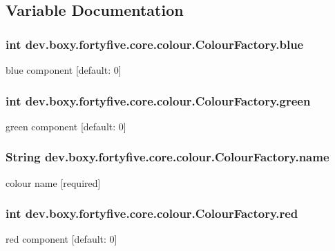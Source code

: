 \subsection{Variable Documentation}
\hypertarget{group__colours_gaa387e90b3938158d073d2aeae5105111}{
\subsubsection[{blue}]{\setlength{\rightskip}{0pt plus 5cm}int {\bf dev.boxy.fortyfive.core.colour.ColourFactory.blue}}}
\label{da/d58/group__colours_gaa387e90b3938158d073d2aeae5105111}
blue component \mbox{[}default: 0\mbox{]} \hypertarget{group__colours_gab377d979269fd05f929493dc79ee074a}{
\subsubsection[{green}]{\setlength{\rightskip}{0pt plus 5cm}int {\bf dev.boxy.fortyfive.core.colour.ColourFactory.green}}}
\label{da/d58/group__colours_gab377d979269fd05f929493dc79ee074a}
green component \mbox{[}default: 0\mbox{]} \hypertarget{group__colours_ga4d56f9874f82e7285e41c8a295069047}{
\subsubsection[{name}]{\setlength{\rightskip}{0pt plus 5cm}String {\bf dev.boxy.fortyfive.core.colour.ColourFactory.name}}}
\label{da/d58/group__colours_ga4d56f9874f82e7285e41c8a295069047}
colour name \mbox{[}required\mbox{]} \hypertarget{group__colours_gab62f99627952fcf9923c257b8a6da024}{
\subsubsection[{red}]{\setlength{\rightskip}{0pt plus 5cm}int {\bf dev.boxy.fortyfive.core.colour.ColourFactory.red}}}
\label{da/d58/group__colours_gab62f99627952fcf9923c257b8a6da024}
red component \mbox{[}default: 0\mbox{]} 